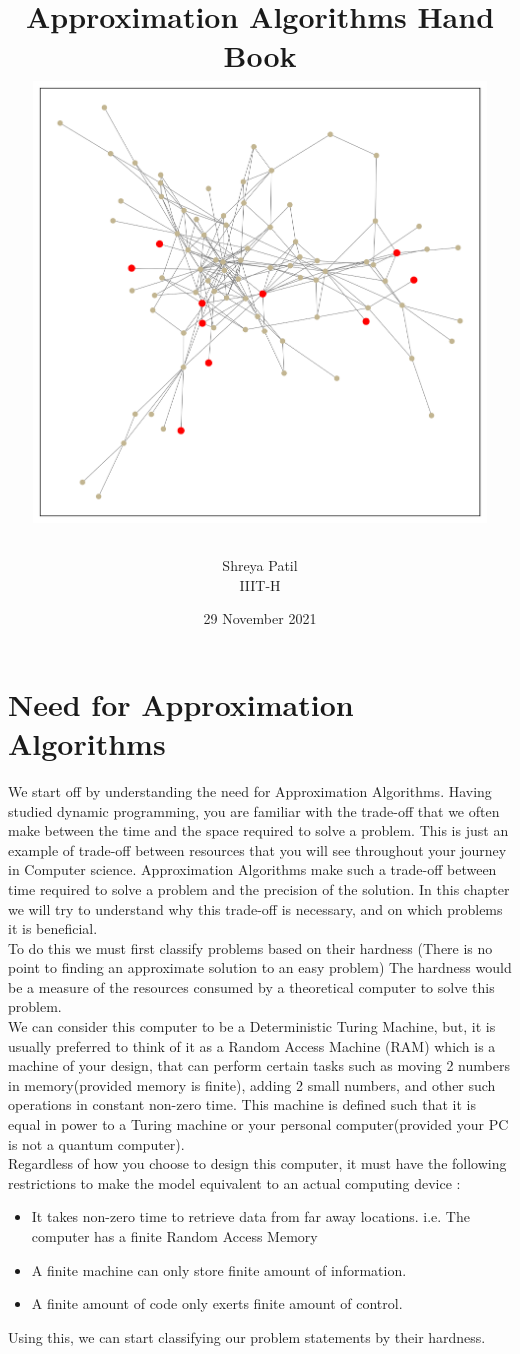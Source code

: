 \documentclass[12pt]{report}
\title{
{Approximation Algorithms Hand Book}\\

{\includegraphics[width=12cm, height=12cm]{hmpg.jpg}}
}
\author{Shreya Patil\\IIIT-H}
\date{29 November 2021}
\begin{document}
\maketitle


\chapter{Need for Approximation Algorithms}
We start off by understanding the need for Approximation Algorithms. Having studied dynamic programming, you are familiar with the trade-off that we often make between the time and the space required to solve a problem. This is just an example of trade-off between resources that you will see throughout your journey in Computer science. Approximation Algorithms make such a trade-off between time required to solve a problem and the precision of the solution. In this chapter we will try to understand why this trade-off is necessary, and on which problems it is beneficial. \\

To do this we must first classify problems based on their hardness (There is no point to finding an approximate solution to an easy problem) The hardness would be a measure of the resources consumed by a theoretical computer to solve this problem.\\ 
We can consider this computer to be a Deterministic Turing Machine, but, it is usually preferred to think of it as a Random Access Machine (RAM) which is a machine of your design, that can perform certain tasks such as moving 2 numbers in memory(provided memory is finite), adding 2 small numbers, and other such operations in constant non-zero time. This machine is defined such that it is equal in power to a Turing machine or your personal computer(provided your PC is not a quantum computer). \\
Regardless of how you choose to design this computer, it must have the following restrictions to make the model equivalent to an actual computing device :
\begin{itemize}
  \item It takes non-zero time to retrieve data from far away locations. i.e. The computer has a finite Random Access Memory
  \item A finite machine can only store finite amount of information.
  \item A finite amount of code only exerts finite amount of control.
\end{itemize}

Using this, we can start classifying our problem statements by their hardness.
\end{document}
